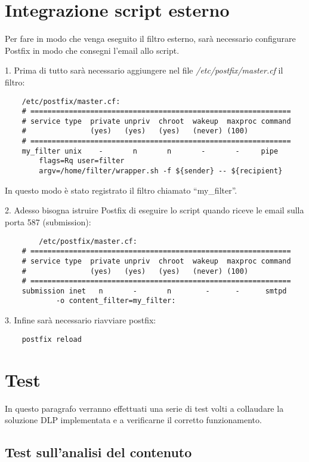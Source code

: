     \section{Integrazione script esterno}
    Per fare in modo che venga eseguito il filtro esterno, sarà necessario configurare Postfix in modo
    che consegni l'email allo script.
    
    1. Prima di tutto sarà necessario aggiungere nel file \textit{/etc/postfix/master.cf} il filtro:

    \begin{verbatim}
    /etc/postfix/master.cf:
    # =============================================================
    # service type  private unpriv  chroot  wakeup  maxproc command
    #               (yes)   (yes)   (yes)   (never) (100)
    # =============================================================
    my_filter unix	  -	      n	      n	      -	      -	    pipe
	    flags=Rq user=filter 
        argv=/home/filter/wrapper.sh -f ${sender} -- ${recipient}
    \end{verbatim}
    In questo modo è stato registrato il filtro chiamato ``my\_filter''.
    
    2. Adesso bisogna istruire Postfix di eseguire lo script quando riceve le email sulla porta 587 (submission):

    \begin{verbatim}
        /etc/postfix/master.cf:
    # =============================================================
    # service type  private unpriv  chroot  wakeup  maxproc command
    #               (yes)   (yes)   (yes)   (never) (100)
    # =============================================================
    submission inet   n       -       n        -      -      smtpd
            -o content_filter=my_filter:  
    \end{verbatim}
    
    3. Infine sarà necessario riavviare postfix:

    \begin{verbatim}
    postfix reload 
    \end{verbatim}
    

    \section{Test}
    In questo paragrafo verranno effettuati una serie di test volti a collaudare la soluzione DLP 
    implementata e a verificarne il corretto funzionamento.

    \subsection{Test sull'analisi del contenuto}


